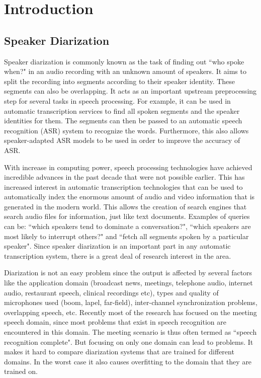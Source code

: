 \chapter{Introduction}

\section{Speaker Diarization}
Speaker diarization is commonly known as the task of finding out ``who spoke when?" in an audio recording with an unknown amount of speakers. It aims to split the recording into segments according to their speaker identity. These segments can also be overlapping. It acts as an important upstream preprocessing step for several tasks in speech processing. For example, it can be used in automatic transcription services to find all spoken segments and the speaker identities for them. The segments can then be passed to an automatic speech recognition (ASR) system to recognize the words. Furthermore, this also allows speaker-adapted ASR models to be used in order to improve the accuracy of ASR.

With increase in computing power, speech processing technologies have achieved incredible advances in the past decade that were not possible earlier. This has increased interest in automatic transcription technologies that can be used to automatically index the enormous amount of audio and video information that is generated in the modern world. This allows the creation of search engines that search audio files for information, just like text documents. Examples of queries can be: ``which speakers tend to dominate a conversation?",  ``which speakers are most likely to interrupt others?" and ``fetch all segments spoken by a particular speaker". Since speaker diarization is an important part in any automatic transcription system, there is a great deal of research interest in the area.

Diarization is not an easy problem since the output is affected by several factors like the application domain (broadcast news, meetings, telephone audio, internet audio, restaurant speech, clinical recordings etc), types and quality of microphones used (boom, lapel, far-field), inter-channel synchronization problems, overlapping speech, etc. Recently most of the research has focused on the meeting speech domain, since most problems that exist in speech recognition are encountered in this domain. The meeting scenario is thus often termed as ``speech recognition complete". But focusing on only one domain can lead to problems. It makes it hard to compare diarization systems that are trained for different domains. In the worst case it also causes overfitting to the domain that they are trained on.

